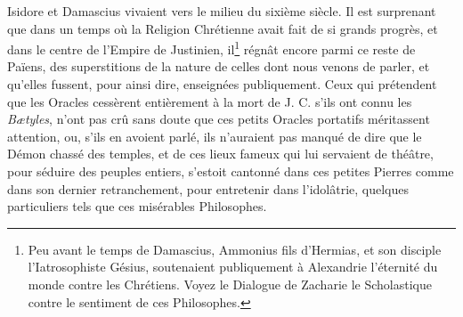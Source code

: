 \documentclass[a4paper, 11pt, oneside, polutonikogreek, french, landscape]{article}
\begin{document}
Isidore et Damascius vivaient vers le milieu du sixième siècle. Il est surprenant que dans un temps où la Religion Chrétienne avait fait de si grands progrès, et dans le centre de l'Empire de Justinien, il\footnote{Peu avant le temps de Damascius, Ammonius fils d'Hermias, et son disciple l'Iatrosophiste Gésius, soutenaient publiquement à Alexandrie l'éternité du monde contre les Chrétiens. Voyez le Dialogue de Zacharie le Scholastique contre le sentiment de ces Philosophes.} régnât encore parmi ce reste de Païens, des superstitions de la nature de celles dont nous venons de parler, et qu'elles fussent, pour ainsi dire, enseignées publiquement. Ceux qui prétendent que les Oracles cessèrent entièrement à la mort de J. C. s'ils ont connu les \emph{Bætyles}, n'ont pas crû sans doute que ces petits Oracles portatifs méritassent attention, ou, s'ils en avoient parlé, ils n'auraient pas manqué de dire que le Démon chassé des temples, et de ces lieux fameux qui lui servaient de théâtre, pour séduire des peuples entiers, s'estoit cantonné dans ces petites Pierres comme dans son dernier retranchement, pour entretenir dans l'idolâtrie, quelques particuliers tels que ces misérables Philosophes.
\end{document}
